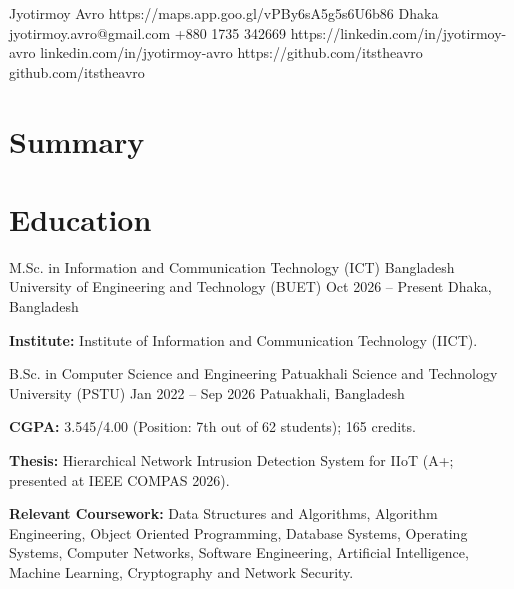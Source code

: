 \documentclass[11pt, a4paper]{article}
\begin{document}
\frenchspacing


\cvHeader
    {Jyotirmoy Avro}
    {https://maps.app.goo.gl/vPBy6sA5g5s6U6b86}
    {Dhaka}
    {jyotirmoy.avro@gmail.com}
    {+880 1735 342669}
    {https://linkedin.com/in/jyotirmoy-avro}
    {linkedin.com/in/jyotirmoy-avro}
    {https://github.com/itstheavro}
    {github.com/itstheavro}

\section{Summary}

\section{Education}
\cvEducation
    {M.Sc. in Information and Communication Technology (ICT)}
    {Bangladesh University of Engineering and Technology (BUET)}
    {Oct 2026 -- Present}
    {Dhaka, Bangladesh}
    {
        \item \textbf{Institute:} Institute of Information and Communication Technology (IICT).
    }

\cvEducation
    {B.Sc. in Computer Science and Engineering}
    {Patuakhali Science and Technology University (PSTU)}
    {Jan 2022 -- Sep 2026}
    {Patuakhali, Bangladesh}
    {
        \item \textbf{CGPA:} 3.545/4.00 (Position: 7th out of 62 students); 165 credits.
        \item \textbf{Thesis:} Hierarchical Network Intrusion Detection System for IIoT (A+; presented at IEEE COMPAS 2026).
        \item \textbf{Relevant Coursework:} Data Structures and Algorithms, Algorithm Engineering, Object Oriented Programming, Database Systems, Operating Systems, Computer Networks, Software Engineering, Artificial Intelligence, Machine Learning, Cryptography and Network Security.
    }
\end{document}

